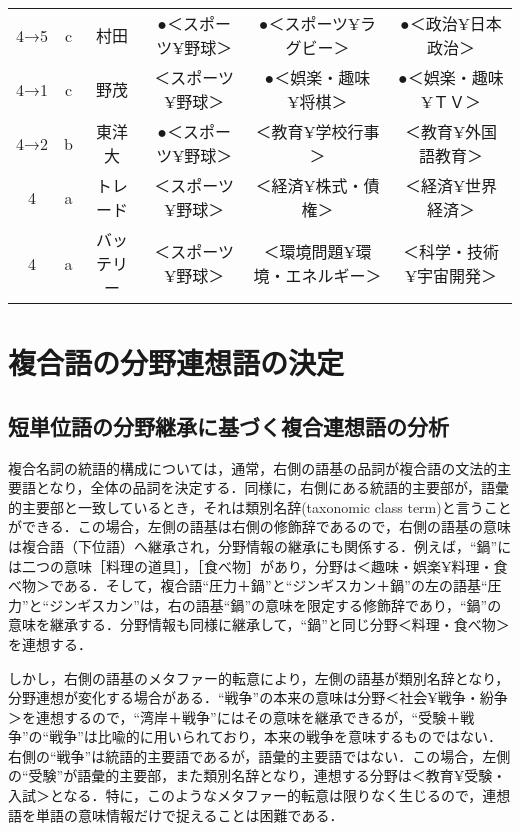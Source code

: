 \begin{sidewaystable}[p]
\begin{center}
\begin{tabular}{cccccc}
4→5 & c & 村田 & ●＜スポーツ¥野球＞ & ●＜スポーツ¥ラグビー＞ & ●＜政治¥日本政治＞ \\
4→1 & c & 野茂 & ＜スポーツ¥野球＞ & ●＜娯楽・趣味¥将棋＞ & ●＜娯楽・趣味¥ＴＶ＞ \\
4→2 & b & 東洋大 & ●＜スポーツ¥野球＞ & ＜教育¥学校行事＞ & ＜教育¥外国語教育＞ \\
4 & a & トレード & ＜スポーツ¥野球＞ & ＜経済¥株式・債権＞ & ＜経済¥世界経済＞ \\
4 & a & バッテリー & ＜スポーツ¥野球＞ & ＜環境問題¥環境・エネルギー＞ & ＜科学・技術¥宇宙開発＞ \\
    \hline
  \end{tabular}
 \end{center}
\end{sidewaystable}


\section{複合語の分野連想語の決定}

\subsection{短単位語の分野継承に基づく複合連想語の分析}

複合名詞の統語的構成については，通常，右側の語基の品詞が複合語の文法的主要語となり，全体の品詞を決定する．同様に，右側にある統語的主要部が，語彙的主要部と一致しているとき，それは類別名辞(taxonomic class term)と言うことができる\cite{油井1997,Williams1981}．この場合，左側の語基は右側の修飾辞であるので，右側の語基の意味は複合語（下位語）へ継承され，分野情報の継承にも関係する．例えば，``鍋''には二つの意味［料理の道具］，［食べ物］があり，分野は＜趣味・娯楽¥料理・食べ物＞である．そして，複合語``圧力＋鍋''と``ジンギスカン＋鍋''の左の語基``圧力''と``ジンギスカン''は，右の語基``鍋''の意味を限定する修飾辞であり，``鍋''の意味を継承する．分野情報も同様に継承して，``鍋''と同じ分野＜料理・食べ物＞を連想する．

しかし，右側の語基のメタファー的転意により，左側の語基が類別名辞となり，分野連想が変化する場合がある．``戦争''の本来の意味は分野＜社会¥戦争・紛争＞を連想するので，``湾岸＋戦争''にはその意味を継承できるが，``受験＋戦争''の``戦争''は比喩的に用いられており，本来の戦争を意味するものではない．右側の``戦争''は統語的主要語であるが，語彙的主要語ではない．この場合，左側の``受験''が語彙的主要部，また類別名辞となり，連想する分野は＜教育¥受験・入試＞となる．特に，このようなメタファー的転意は限りなく生じるので，連想語を単語の意味情報\cite{河合1992}だけで捉えることは困難である．

